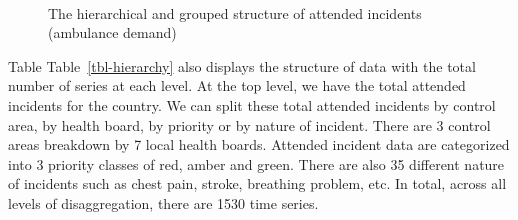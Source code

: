 \documentclass[
  authoryear,
  preprint,
  3p]{elsarticle}
\begin{document}
\begin{figure}

\begin{minipage}[t]{0.56\linewidth}

{\centering 


}

\end{minipage}%
%
\begin{minipage}[t]{0.02\linewidth}

{\centering 

~

}

\end{minipage}%
%
\begin{minipage}[t]{0.42\linewidth}

{\centering 


}

\end{minipage}%

\caption{\label{fig-hierarchy}The hierarchical and grouped structure of
attended incidents (ambulance demand)}

\end{figure}

Table Table~\ref{tbl-hierarchy} also displays the structure of data with
the total number of series at each level. At the top level, we have the
total attended incidents for the country. We can split these total
attended incidents by control area, by health board, by priority or by
nature of incident. There are 3 control areas breakdown by 7 local
health boards. Attended incident data are categorized into 3 priority
classes of red, amber and green. There are also 35 different nature of
incidents such as chest pain, stroke, breathing problem, etc. In total,
across all levels of disaggregation, there are 1530 time series.
\end{document}
